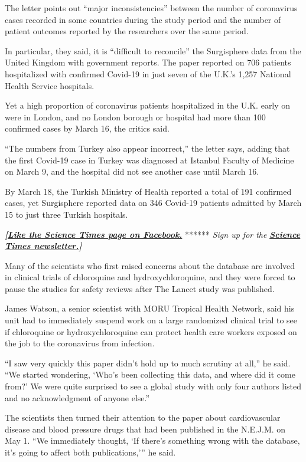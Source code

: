 The letter points out ``major inconsistencies'' between the number of
coronavirus cases recorded in some countries during the study period and
the number of patient outcomes reported by the researchers over the same
period.

In particular, they said, it is ``difficult to reconcile'' the
Surgisphere data from the United Kingdom with government reports. The
paper reported on 706 patients hospitalized with confirmed Covid-19 in
just seven of the U.K.'s 1,257 National Health Service hospitals.

Yet a high proportion of coronavirus patients hospitalized in the U.K.
early on were in London, and no London borough or hospital had more than
100 confirmed cases by March 16, the critics said.

``The numbers from Turkey also appear incorrect,'' the letter says,
adding that the first Covid-19 case in Turkey was diagnosed at Istanbul
Faculty of Medicine on March 9, and the hospital did not see another
case until March 16.

By March 18, the Turkish Ministry of Health reported a total of 191
confirmed cases, yet Surgisphere reported data on 346 Covid-19 patients
admitted by March 15 to just three Turkish hospitals.

\textbf{\emph{{[}}\href{http://on.fb.me/1paTQ1h}{\emph{Like the Science
Times page on Facebook.}}} ****** \emph{\textbar{} Sign up for the}
\textbf{\href{http://nyti.ms/1MbHaRU}{\emph{Science Times
newsletter.}}\emph{{]}}}

Many of the scientists who first raised concerns about the database are
involved in clinical trials of chloroquine and hydroxychloroquine, and
they were forced to pause the studies for safety reviews after The
Lancet study was published.

James Watson, a senior scientist with MORU Tropical Health Network, said
his unit had to immediately suspend work on a large randomized clinical
trial to see if chloroquine or hydroxychloroquine can protect health
care workers exposed on the job to the coronavirus from infection.

``I saw very quickly this paper didn't hold up to much scrutiny at
all,'' he said. ``We started wondering, `Who's been collecting this
data, and where did it come from?' We were quite surprised to see a
global study with only four authors listed and no acknowledgment of
anyone else.''

The scientists then turned their attention to the paper about
cardiovascular disease and blood pressure drugs that had been published
in the N.E.J.M. on May 1. ``We immediately thought, `If there's
something wrong with the database, it's going to affect both
publications,''' he said.

